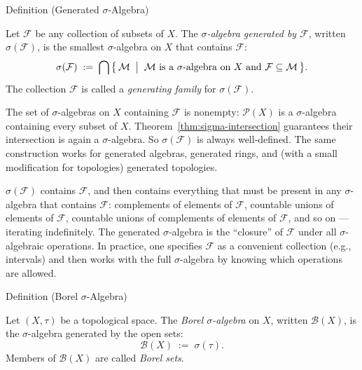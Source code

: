 \begin{definitionbox}{Definition (Generated $\sigma$-Algebra)}
\begin{definition}\label{def:generated-sigma}
Let $\mathcal{F}$ be any collection of subsets of $X$. The
\emph{$\sigma$-algebra generated by $\mathcal{F}$}, written $\sigma(\mathcal{F})$,
is the smallest $\sigma$-algebra on $X$ that contains $\mathcal{F}$:
\[
\sigma(\mathcal{F})
\;:=\;
\bigcap\,\bigl\{\, \mathcal{M} \;\bigm|\;
\mathcal{M} \text{ is a $\sigma$-algebra on } X
\text{ and } \mathcal{F} \subseteq \mathcal{M} \,\bigr\}.
\]
The collection $\mathcal{F}$ is called a \emph{generating family} for
$\sigma(\mathcal{F})$.
\end{definition}
\end{definitionbox}

\begin{remark*}
The set of $\sigma$-algebras on $X$ containing $\mathcal{F}$ is nonempty:
$\mathcal{P}(X)$ is a $\sigma$-algebra containing every subset of $X$.
Theorem~\ref{thm:sigma-intersection} guarantees their intersection is again a
$\sigma$-algebra. So $\sigma(\mathcal{F})$ is always well-defined. The same
construction works for generated algebras, generated rings, and (with a small
modification for topologies) generated topologies.
\end{remark*}

\begin{remark*}
$\sigma(\mathcal{F})$ contains $\mathcal{F}$, and then contains everything
that must be present in any $\sigma$-algebra that contains $\mathcal{F}$:
complements of elements of $\mathcal{F}$, countable unions of elements of
$\mathcal{F}$, countable unions of complements of elements of $\mathcal{F}$,
and so on — iterating indefinitely. The generated $\sigma$-algebra is the
``closure'' of $\mathcal{F}$ under all $\sigma$-algebraic operations. In
practice, one specifies $\mathcal{F}$ as a convenient collection (e.g.,
intervals) and then works with the full $\sigma$-algebra by knowing which
operations are allowed.
\end{remark*}

\begin{definitionbox}{Definition (Borel $\sigma$-Algebra)}
\begin{definition}\label{def:borel}
Let $(X, \tau)$ be a topological space. The \emph{Borel $\sigma$-algebra}
on $X$, written $\mathcal{B}(X)$, is the $\sigma$-algebra generated by the
open sets:
\[
\mathcal{B}(X) \;:=\; \sigma(\tau).
\]
Members of $\mathcal{B}(X)$ are called \emph{Borel sets}.
\end{definition}
\end{definitionbox}

